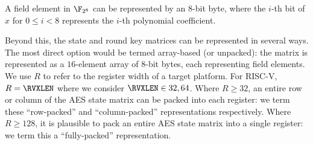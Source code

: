 
A field element in $\F_{2^8}$ can be represented by an
$8$-bit byte,
where the $i$-th bit of $x$ for $0 \leq i < 8$ represents the $i$-th 
polynomial coefficient.

Beyond this, the state and round key matrices can be represented in
several ways.
The most direct option would be termed
array-based (or unpacked):
the matrix is represented as a $16$-element array of $8$-bit bytes, each
representing field elements.
We use $R$ to refer to the register width of a target platform.
For RISC-V, $R = \RVXLEN$ where we consider $\RVXLEN \in {32,64}$.
Where $R \geq  32$,
an entire row or column of the AES state matrix can be packed into each 
register:
we term these
   ``row-packed''  
and
``column-packed''
representations respectively.
Where $R \geq 128$, 
it is plausible to pack
an entire AES state matrix
into a single register: 
we term this a 
 ``fully-packed'' 
representation.

